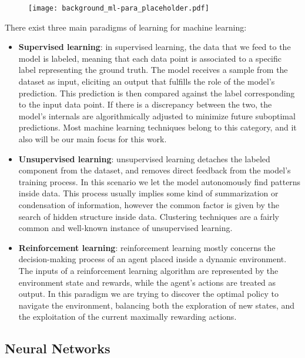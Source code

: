 \begin{figure}[t!]
    \centering
    \texttt{[image: background\_ml-para\_placeholder.pdf]}
    \caption{}
    \label{fig:background_ml-paradigm}
\end{figure}

There exist three main paradigms of learning for machine learning:
\begin{itemize}
    \item \textbf{Supervised learning}: in supervised learning, the data that we feed to the model is labeled, meaning that each data point is associated to a specific label representing the ground truth.
The model receives a sample from the dataset as input, eliciting an output that fulfills the role of the model's prediction.
This prediction is then compared against the label corresponding to the input data point.
If there is a discrepancy between the two, the model's internals are algorithmically adjusted to minimize future suboptimal predictions.
Most machine learning techniques belong to this category, and it also will be our main focus for this work.
    \item \textbf{Unsupervised learning}: unsupervised learning detaches the labeled component from the dataset, and removes direct feedback from the model's training process.
In this scenario we let the model autonomously find patterns inside data.
This process usually implies some kind of summarization or condensation of information, however the common factor is given by the search of hidden structure inside data.
Clustering techniques are a fairly common and well-known instance of unsupervised learning. 
    \item \textbf{Reinforcement learning}: reinforcement learning mostly concerns the decision-making process of an agent placed inside a dynamic environment.
The inputs of a reinforcement learning algorithm are represented by the environment state and rewards, while the agent's actions are treated as output.
In this paradigm we are trying to discover the optimal policy to navigate the environment, balancing both the exploration of new states, and the exploitation of the current maximally rewarding actions.
\end{itemize}

\subsection{Neural Networks}

